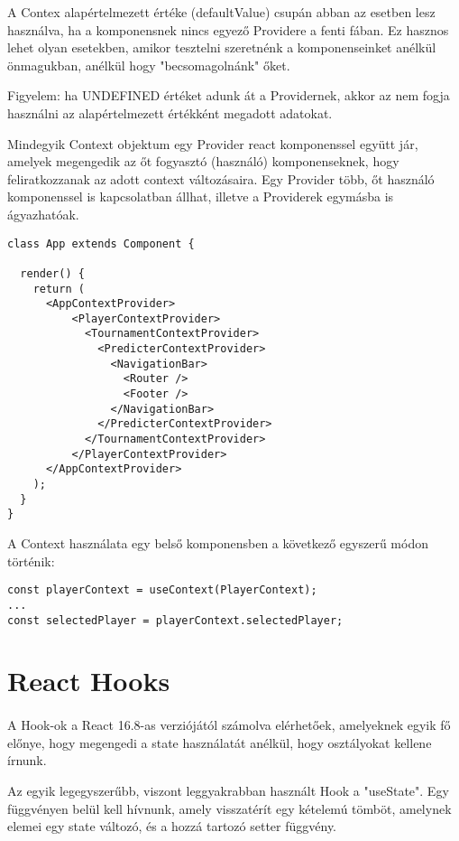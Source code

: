 A Contex alapértelmezett értéke (defaultValue) csupán abban az esetben lesz használva, ha a komponensnek nincs egyező Providere a fenti fában. Ez hasznos lehet olyan esetekben, amikor tesztelni szeretnénk a komponenseinket anélkül önmagukban, anélkül hogy "becsomagolnánk" őket.

Figyelem: ha UNDEFINED értéket adunk át a Providernek, akkor az nem fogja használni az alapértelmezett értékként megadott adatokat. 

Mindegyik Context objektum egy Provider react komponenssel együtt jár, amelyek megengedik az őt fogyasztó (használó) komponenseknek, hogy feliratkozzanak az adott context változásaira. Egy Provider több, őt használó komponenssel is kapcsolatban állhat, illetve a Providerek egymásba is ágyazhatóak.

\begin{lstlisting}[caption=A Providerek egymásba ágyazása]
class App extends Component {

  render() {
    return (
      <AppContextProvider>
          <PlayerContextProvider>
            <TournamentContextProvider>
              <PredicterContextProvider>
                <NavigationBar>
                  <Router />
                  <Footer />
                </NavigationBar>
              </PredicterContextProvider>
            </TournamentContextProvider>
          </PlayerContextProvider>
      </AppContextProvider>
    );
  }
}
\end{lstlisting}

A Context használata egy belső komponensben a következő egyszerű módon történik:
\begin{lstlisting}[caption=A Context értékének a felhasználása]
const playerContext = useContext(PlayerContext);
...
const selectedPlayer = playerContext.selectedPlayer;
\end{lstlisting}

\section{React Hooks}
\paragraph{}
A Hook-ok a React 16.8-as verziójától számolva elérhetőek, amelyeknek egyik fő előnye, hogy megengedi a state használatát anélkül, hogy osztályokat kellene írnunk.

Az egyik legegyszerűbb, viszont leggyakrabban használt Hook a "useState". Egy függvényen belül kell hívnunk, amely visszatérít egy kételemú tömböt, amelynek elemei egy state változó, és a hozzá tartozó setter függvény.

